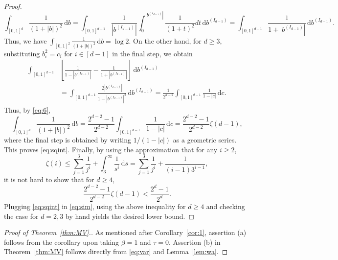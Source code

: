 \documentclass[11pt,reqno]{amsart}
\numberwithin{equation}{section}
\theoremstyle{definition}
\newcommand{\diff}{{\,\mathrm d}}
\begin{document}
\begin{proof}
	\begin{equation}\label{eq:6}
		\int_{[0,1]^d} \frac{1}{(1+|b|)^2} \diff b=\int_{[0,1]^{d-1}} \frac{1}{|b^{(I_{d-1})}|} \int_0^{|b^{(I_{d-1})}|} \frac{1}{(1+t)^2} dt \diff b^{(I_{d-1})}=\int_{[0,1]^{d-1}} \frac{1}{1+|b^{(I_{d-1})}|} \diff b^{(I_{d-1})}.
	\end{equation}
	Thus, we have $\int_{[0,1]^2} \frac{1}{(1+|b|)^2} \diff b=\log 2$.
	On the other hand, for $d \ge 3$, substituting $b_i^2=c_i$ for $i \in [d-1]$ in the final step, we obtain 
	\begin{align*}
		\int_{[0,1]^{d-1}} &\left[\frac{1}{1-|b^{(I_{d-1})}|} -  \frac{1}{1+|b^{(I_{d-1})}|} \right]\diff b^{(I_{d-1})}\\
		&= \int_{[0,1]^{d-1}} \frac{2|b^{(I_{d-1})}|}{1-|b^{(I_{d-1})}|^2} \diff b^{(I_{d-1})}=\frac{1}{2^{d-2}}	\int_{[0,1]^{d-1}} \frac{1}{1-|c|}  \diff c.
	\end{align*}
	Thus, by \eqref{eq:6},
	$$
	\int_{[0,1]^d} \frac{1}{(1+|b|)^2} \diff b= \frac{2^{d-2} -1}{2^{d-2}} \int_{[0,1]^{d-1}} \frac{1}{1-|c|}  \diff c= \frac{2^{d-2} -1}{2^{d-2}} \zeta(d-1),
	$$
	where the final step is obtained by writing $1/(1-|c|)$ as a geometric series. This proves \eqref{eq:sqint}. Finally, by using the approximation that for any $i \ge 2$,
	$$
	\zeta(i) \le \sum_{j=1}^{3}\frac{1}{j^i}+ \int_{3}^\infty \frac{1}{s^i} \diff s=\sum_{j=1}^{3}\frac{1}{j^i}+ \frac{1}{(i-1)3^{i-1}},
	$$
	it is not hard to show that for $d \ge 4$,
	$$
	\frac{2^{d-2} -1}{2^{d-2}} \zeta(d-1) <  \frac{2^d-1}{2^d}.
	$$
	Plugging \eqref{eq:sqint} in \eqref{eq:sim}, using the above inequality for $d \ge 4$ and checking the case for $d=2,3$ by hand yields the desired lower bound.
\end{proof}




\begin{proof}[Proof of Theorem~\ref{thm:MV}.]
	As mentioned after Corollary~\ref{cor:1}, assertion (a) follows from the corollary upon taking $\beta=1$ and $\tau=0$. Assertion (b) in Theorem~\ref{thm:MV} follows directly from \eqref{eq:var} and Lemma~\ref{lem:wa}. 
\end{proof}
\end{document}

